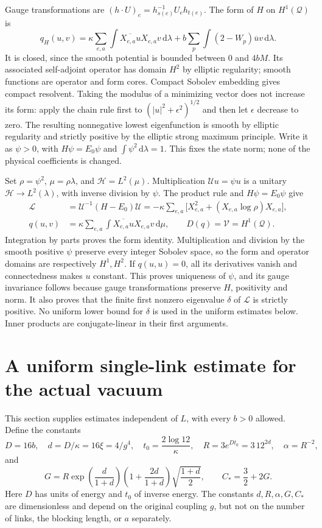 \documentclass[11pt]{article}
\newcommand{\dd}{\,\mathrm d}
\newcommand{\HH}{\mathscr H}
\newcommand{\LL}{\mathscr L}
\newcommand{\VV}{\mathscr V}
\begin{document}
Gauge transformations are $(h\cdot U)_e=h_{s(e)}^{-1}U_eh_{t(e)}$.
The form of $H$ on $H^1(\mathcal Q)$ is
\[
 q_H(u,v)=\kappa\sum_{e,a}\int\overline{X_{e,a}u}X_{e,a}v\dd\lambda
        +b\sum_p\int(2-W_p)\overline uv\dd\lambda.
\]
It is closed, since the smooth potential is bounded between $0$ and
$4bM$. Its associated self-adjoint operator has domain $H^2$ by elliptic
regularity; smooth functions are operator and form cores. Compact Sobolev
embedding gives compact resolvent. Taking the modulus of a minimizing
vector does not increase its form: apply the chain rule first to
$(|u|^2+\epsilon^2)^{1/2}$ and then let $\epsilon$ decrease to zero.
The resulting nonnegative lowest eigenfunction is smooth by elliptic
regularity and strictly positive by the elliptic strong maximum principle.
Write it as $\psi>0$, with $H\psi=E_0\psi$ and $\int\psi^2\dd\lambda=1$.
This fixes the state norm; none of the physical coefficients is changed.

Set $\rho=\psi^2$, $\mu=\rho\lambda$, and $\HH=L^2(\mu)$.
Multiplication $\mathcal Uu=\psi u$ is a unitary $\HH\to L^2(\lambda)$,
with inverse division by $\psi$. The product rule and $H\psi=E_0\psi$ give
\begin{align}
 \LL&=\mathcal U^{-1}(H-E_0)\mathcal U
 =-\kappa\sum_{e,a}\bigl[X_{e,a}^2+(X_{e,a}\log\rho)X_{e,a}\bigr],
 \label{eq:gs}\\
 q(u,v)&=\kappa\sum_{e,a}\int\overline{X_{e,a}u}X_{e,a}v\dd\mu,
 \qquad D(q)=\VV=H^1(\mathcal Q).\label{eq:q}
\end{align}
Integration by parts proves the form identity. Multiplication and division
by the smooth positive $\psi$ preserve every integer Sobolev space, so
the form and operator domains are respectively $H^1,H^2$.
If $q(u,u)=0$, all its derivatives vanish and connectedness makes $u$
constant. This proves uniqueness of $\psi$, and its gauge invariance
follows because gauge transformations preserve $H$, positivity and norm.
It also proves that the finite first nonzero eigenvalue $\delta$ of
$\LL$ is strictly positive. No uniform lower bound for $\delta$ is used
in the uniform estimates below. Inner products are conjugate-linear in
their first arguments.

\section{A uniform single-link estimate for the actual vacuum}

This section supplies estimates independent of $L$, with every $b>0$
allowed. Define the constants
\begin{equation}\label{eq:uniformconstants}
 D=16b,\quad d=D/\kappa=16\xi=4/g^4,\quad
 t_0=\frac{2\log12}{\kappa},\quad
 R=3e^{Dt_0}=3\,12^{2d},\quad \alpha=R^{-2},
\end{equation}
and
\begin{equation}\label{eq:G}
 G=R\exp\!\left(\frac d{1+d}\right)
       \left(1+\frac{2d}{1+d}\right)\sqrt{\frac{1+d}{2}},
 \qquad C_*=\frac32+2G.
\end{equation}
Here $D$ has units of energy and $t_0$ of inverse energy.
The constants $d,R,\alpha,G,C_*$ are dimensionless and depend on the
original coupling $g$, but not on the number of links, the blocking
length, or $a$ separately.
\end{document}
